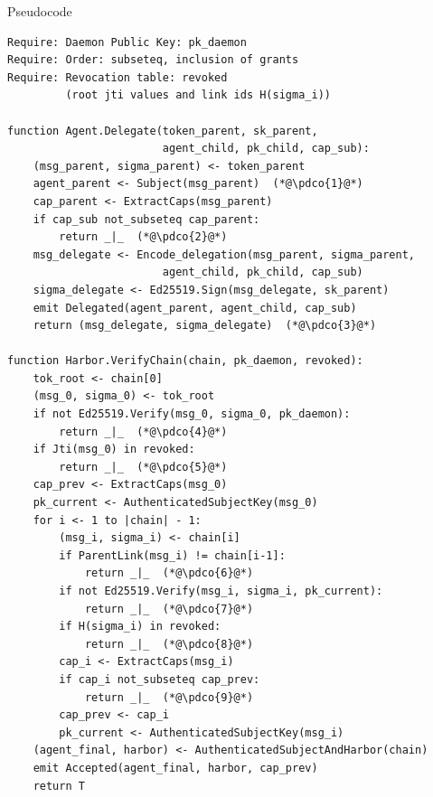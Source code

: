 \documentclass[11pt,a4paper]{article}
\theoremstyle{definition}
\begin{document}
\begin{pdlisting}{Pseudocode}{}
\begin{lstlisting}[style=pseudocode,caption={Algorithm 3: Authorization Chain Verification},label={alg:delegation}]
Require: Daemon Public Key: pk_daemon
Require: Order: subseteq, inclusion of grants
Require: Revocation table: revoked
         (root jti values and link ids H(sigma_i))

function Agent.Delegate(token_parent, sk_parent,
                        agent_child, pk_child, cap_sub):
    (msg_parent, sigma_parent) <- token_parent
    agent_parent <- Subject(msg_parent)  (*@\pdco{1}@*)
    cap_parent <- ExtractCaps(msg_parent)
    if cap_sub not_subseteq cap_parent:
        return _|_  (*@\pdco{2}@*)
    msg_delegate <- Encode_delegation(msg_parent, sigma_parent,
                        agent_child, pk_child, cap_sub)
    sigma_delegate <- Ed25519.Sign(msg_delegate, sk_parent)
    emit Delegated(agent_parent, agent_child, cap_sub)
    return (msg_delegate, sigma_delegate)  (*@\pdco{3}@*)

function Harbor.VerifyChain(chain, pk_daemon, revoked):
    tok_root <- chain[0]
    (msg_0, sigma_0) <- tok_root
    if not Ed25519.Verify(msg_0, sigma_0, pk_daemon):
        return _|_  (*@\pdco{4}@*)
    if Jti(msg_0) in revoked:
        return _|_  (*@\pdco{5}@*)
    cap_prev <- ExtractCaps(msg_0)
    pk_current <- AuthenticatedSubjectKey(msg_0)
    for i <- 1 to |chain| - 1:
        (msg_i, sigma_i) <- chain[i]
        if ParentLink(msg_i) != chain[i-1]:
            return _|_  (*@\pdco{6}@*)
        if not Ed25519.Verify(msg_i, sigma_i, pk_current):
            return _|_  (*@\pdco{7}@*)
        if H(sigma_i) in revoked:
            return _|_  (*@\pdco{8}@*)
        cap_i <- ExtractCaps(msg_i)
        if cap_i not_subseteq cap_prev:
            return _|_  (*@\pdco{9}@*)
        cap_prev <- cap_i
        pk_current <- AuthenticatedSubjectKey(msg_i)
    (agent_final, harbor) <- AuthenticatedSubjectAndHarbor(chain)
    emit Accepted(agent_final, harbor, cap_prev)
    return T
\end{lstlisting}
\begin{pdcallouts}
\end{pdcallouts}
\end{pdlisting}
\end{document}
